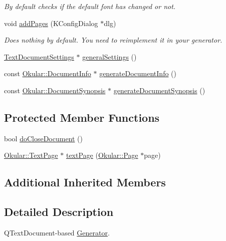 \begin{DoxyCompactItemize}
\begin{DoxyCompactList}\small\item\em By default checks if the default font has changed or not. \end{DoxyCompactList}\item 
void \hyperlink{classOkular_1_1TextDocumentGenerator_acc42fa387044ecf9f26bc1b4952ad6d3}{add\+Pages} (K\+Config\+Dialog $\ast$dlg)
\begin{DoxyCompactList}\small\item\em Does nothing by default. You need to reimplement it in your generator. \end{DoxyCompactList}\item 
\hyperlink{classOkular_1_1TextDocumentSettings}{Text\+Document\+Settings} $\ast$ \hyperlink{classOkular_1_1TextDocumentGenerator_a776f1b9f38f55fdf086e022388ee4e36}{general\+Settings} ()
\item 
const \hyperlink{classOkular_1_1DocumentInfo}{Okular\+::\+Document\+Info} $\ast$ \hyperlink{classOkular_1_1TextDocumentGenerator_a47f4b3917926e55c410c76321f76ff0e}{generate\+Document\+Info} ()
\item 
const \hyperlink{classOkular_1_1DocumentSynopsis}{Okular\+::\+Document\+Synopsis} $\ast$ \hyperlink{classOkular_1_1TextDocumentGenerator_a7017389c5e43bcf93ebf6a1a028674a3}{generate\+Document\+Synopsis} ()
\end{DoxyCompactItemize}
\subsection*{Protected Member Functions}
\begin{DoxyCompactItemize}
\item 
bool \hyperlink{classOkular_1_1TextDocumentGenerator_a2f0c915dd85d6b4959fb2ee4ccdad218}{do\+Close\+Document} ()
\item 
\hyperlink{classOkular_1_1TextPage}{Okular\+::\+Text\+Page} $\ast$ \hyperlink{classOkular_1_1TextDocumentGenerator_a88ee1468be05fea367d2405749ba93b2}{text\+Page} (\hyperlink{classOkular_1_1Page}{Okular\+::\+Page} $\ast$page)
\end{DoxyCompactItemize}
\subsection*{Additional Inherited Members}


\subsection{Detailed Description}
Q\+Text\+Document-\/based \hyperlink{classOkular_1_1Generator}{Generator}. 

